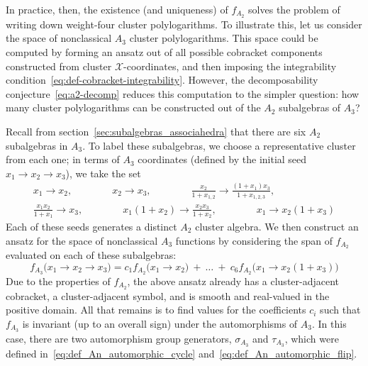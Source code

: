 \documentclass[11pt]{article}
\def\xcoords{$\mathcal{X}$-coordinates}
\begin{document}
In practice, then, the existence (and uniqueness) of $f_{A_2}$ solves the problem of writing down weight-four cluster polylogarithms. To illustrate this, let us consider the space of nonclassical $A_3$ cluster polylogarithms. This space could be computed by forming an ansatz out of all possible cobracket components constructed from cluster \xcoords, and then imposing the integrability condition~\eqref{eq:def-cobracket-integrability}. However, the decomposability conjecture~\eqref{eq:a2-decomp} reduces this computation to the simpler question: how many cluster polylogarithms can be constructed out of the $A_2$ subalgebras of $A_3$? 

Recall from section~\ref{sec:subalgebras_associahedra} that there are six $A_2$ subalgebras in $A_3$. To label these subalgebras, we choose a representative cluster from each one; in terms of $A_3$ coordinates (defined by the initial seed $x_1 \to x_2 \to x_3$), we take the set
\begin{equation}\label{eq:a2-in-a3}
\begin{gathered}
	x_1 \longrightarrow x_2, \qquad \qquad
	x_2 \longrightarrow x_3, \qquad \qquad
	\frac{x_2}{1+x_{1,2}} \longrightarrow \frac{\left(1+x_1\right) x_3}{1+x_{1,2,3}},\\[0.8em]
	\frac{x_1 x_2}{1+x_1} \longrightarrow x_3,\qquad \qquad
	x_1 \left(1+x_2\right) \longrightarrow \frac{x_2 x_3}{1+x_2},\qquad \qquad
	 x_1 \longrightarrow x_2 \left(1+x_3\right)
\end{gathered}	
\end{equation}
Each of these seeds generates a distinct $A_2$ cluster algebra. We then construct an ansatz for the space of nonclassical $A_3$ functions by considering the span of $f_{A_2}$ evaluated on each of these subalgebras:
\begin{equation}\label{eq:fa3-ansatz}
	f_{A_3}\big(x_1\to x_2\to x_3 \big) = c_1 f_{A_2}\big(x_1 \to x_2\big) \ +\ \ldots \ +\ c_6 f_{A_2}\big(x_1\to x_2 \left(1+x_3\right)\big)
\end{equation}	
Due to the properties of $f_{A_2}$, the above ansatz already has a cluster-adjacent cobracket, a cluster-adjacent symbol, and is smooth and real-valued in the positive domain. All that remains is to find values for the coefficients $c_i$ such that $f_{A_3}$ is invariant (up to an overall sign) under the automorphisms of $A_3$. In this case, there are two automorphism group generators, $\sigma_{A_3}$ and $\tau_{A_3}$, which were defined in~\eqref{eq:def_An_automorphic_cycle} and~\eqref{eq:def_An_automorphic_flip}.  
\end{document}
